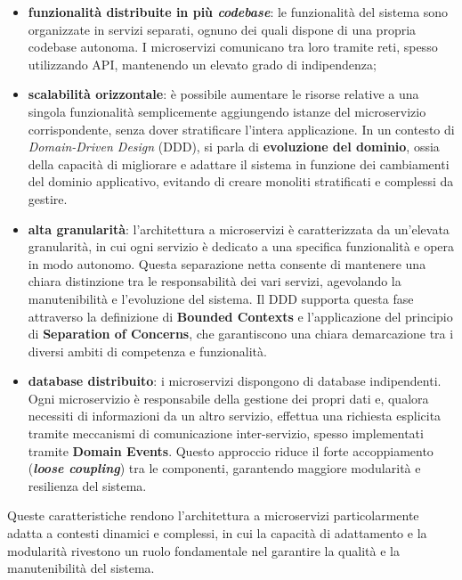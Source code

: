             \begin{itemize}
                \item \textbf{funzionalità distribuite in più \textit{codebase}}: le funzionalità del sistema sono organizzate in servizi separati, ognuno dei quali dispone di una propria codebase autonoma. I microservizi comunicano tra loro tramite reti, spesso utilizzando API, mantenendo un elevato grado di indipendenza;
                \item \textbf{scalabilità orizzontale}: è possibile aumentare le risorse relative a una singola funzionalità semplicemente aggiungendo istanze del microservizio corrispondente, senza dover stratificare l’intera applicazione. In un contesto di \textit{Domain-Driven Design} (DDD), si parla di \textbf{evoluzione del dominio}, ossia della capacità di migliorare e adattare il sistema in funzione dei cambiamenti del dominio applicativo, evitando di creare monoliti stratificati e complessi da gestire.  
                \item \textbf{alta granularità}: l’architettura a microservizi è caratterizzata da un’elevata granularità, in cui ogni servizio è dedicato a una specifica funzionalità e opera in modo autonomo. Questa separazione netta consente di mantenere una chiara distinzione tra le responsabilità dei vari servizi, agevolando la manutenibilità e l’evoluzione del sistema. Il DDD supporta questa fase attraverso la definizione di \textbf{Bounded Contexts} e l’applicazione del principio di \textbf{Separation of Concerns}, che garantiscono una chiara demarcazione tra i diversi ambiti di competenza e funzionalità.  
                \item \textbf{database distribuito}: i microservizi dispongono di database indipendenti. Ogni microservizio è responsabile della gestione dei propri dati e, qualora necessiti di informazioni da un altro servizio, effettua una richiesta esplicita tramite meccanismi di comunicazione inter-servizio, spesso implementati tramite \textbf{Domain Events}. Questo approccio riduce il forte accoppiamento (\textbf{\textit{loose coupling}}) tra le componenti, garantendo maggiore modularità e resilienza del sistema. 
            \end{itemize}  

            Queste caratteristiche rendono l’architettura a microservizi particolarmente adatta a contesti dinamici e complessi, in cui la capacità di adattamento e la modularità rivestono un ruolo fondamentale nel garantire la qualità e la manutenibilità del sistema.

